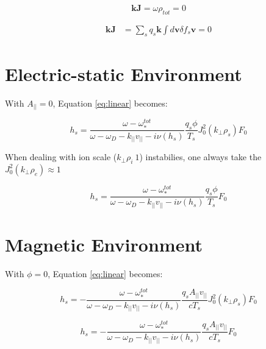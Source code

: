 \begin{equation}
    \textbf{kJ}=\omega \rho_{tot} =0
\end{equation}

\begin{equation}
\begin{aligned}
    \textbf{kJ}{}&=\sum_{s} q_s\textbf{k}\int d\textbf{v} \delta f_s \textbf{v}=0
    \label{eq:j=0}
\end{aligned}
\end{equation}

\section{Electric-static Environment}

With $A_{||}=0$, Equation \ref{eq:linear} becomes:

\begin{equation}
    h_s 
    =\frac{\omega -\omega_*^{tot}}{\omega -\omega_D 
    - k_{||}v_{||}-i\nu(h_s)}\frac{q_s\phi}{T_s}J_0^2(k_\perp\rho_s)F_0
    \label{eq:linear_es}
\end{equation}

When dealing with ion scale ($k_\perp \rho_i ~ 1$) instabilies, one always take the $J^2_0(k_\perp \rho_e) \approx 1$

\begin{equation}
    h_s 
    =\frac{\omega -\omega_*^{tot}}{\omega -\omega_D 
    - k_{||}v_{||}-i\nu(h_s)}\frac{q_s\phi}{T_s}F_0
    \label{eq:linear_es}
\end{equation}

\section{Magnetic Environment}

With $\phi=0$, Equation \ref{eq:linear} becomes:

\begin{equation}
    h_s 
    =
    -\frac{\omega -\omega^{tot}_*}{\omega -\omega_D 
    - k_{||}v_{||}-i\nu(h_s)}\frac{q_sA_{||}v_{||}}{cT_s}J_0^2(k_\perp\rho_s)F_0
    \label{eq:linear_em}
\end{equation}

\begin{equation}
    h_s 
    =
    -\frac{\omega -\omega^{tot}_*}{\omega -\omega_D 
    - k_{||}v_{||}-i\nu(h_s)}\frac{q_sA_{||}v_{||}}{cT_s}F_0
    \label{eq:linear_em}
\end{equation}